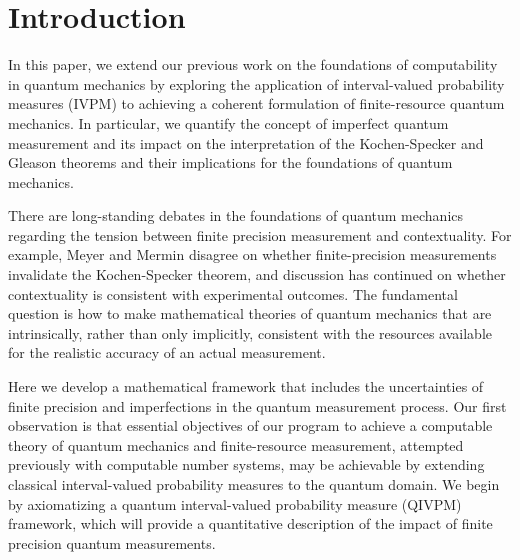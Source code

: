 \documentclass[english,reprint, aps, prl,superscriptaddress, showpacs,
showkeys, longbibliography, amsmath, amssymb]{revtex4-1}
\theoremstyle{plain}
\theoremstyle{definition}
\newcommand{\nb}{\nolinebreak[1] }
\begin{document}
\section{Introduction}

In this paper, we extend our previous work on the foundations of
computability in quantum mechanics by exploring the application of
interval-valued probability measures (IVPM) to achieving a coherent
formulation of finite-resource quantum mechanics.  In particular, we quantify the concept of imperfect quantum measurement and its impact on the interpretation of the Kochen-Specker and Gleason theorems and their implications for the foundations of quantum mechanics. 

There are long-standing debates in the foundations of quantum
mechanics regarding the tension between finite precision measurement
and contextuality\nb\cite{BarrettKent2004,Appleby_2005}.  For example,
Meyer\nb\cite{PhysRevLett.83.3751} and Mermin\nb\cite{Mermin1999} disagree
on whether finite-precision measurements invalidate the Kochen-Specker
theorem\nb\cite{kochenspecker1967,peres1995quantum}, and discussion
has continued on whether contextuality is consistent with  experimental outcomes\nb\cite{Spekkens2005,GuehneKleinmannCabelloEtAl2010,MazurekPuseyKunjwalEtAl2016}. The
fundamental question is how to make mathematical theories of quantum mechanics that are intrinsically, rather than only implicitly, consistent with the resources available for the realistic accuracy of an actual measurement.

Here we develop a mathematical framework that includes the uncertainties of finite precision and imperfections in the quantum measurement process.  Our first observation is that essential objectives of our program to
achieve a computable theory of quantum mechanics and finite-resource
measurement, attempted previously with computable number
systems\nb\cite{usat,geometry2013apsrev4,DQT2014}, may be achievable by
extending classical interval-valued probability
measures\nb\cite{JamisonLodwick2004} to the quantum domain.  We begin by axiomatizing a quantum interval-valued probability measure (QIVPM) framework, which will provide a quantitative description of the impact of finite precision quantum measurements.

\end{document}
